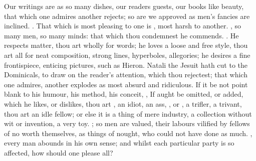Our writings are as so many dishes, our readers guests, our books like beauty,
that which one admires another rejects; so are we approved as men's fancies are
inclined. . That which is most
pleasing to one is , most harsh to another. , so many men, so many minds: that which thou condemnest he
commends. . He respects matter, thou art wholly for words; he loves a loose and
free style, thou art all for neat composition, strong lines, hyperboles,
allegories; he desires a fine frontispiece, enticing pictures, such as
Hieron. Natali the Jesuit hath cut to the Dominicals, to
draw on the reader's attention, which thou rejectest; that which one admires,
another explodes as most absurd and ridiculous. If it be not point blank to his
humour, his method, his conceit, , \etc{} If aught be omitted,
or added, which he likes, or dislikes, thou art , an idiot, an ass, , or , a trifler, a
trivant, thou art an idle fellow; or else it is a thing of mere industry, a
collection without wit or invention, a very toy.
; so men are valued, their labours vilified
by fellows of no worth themselves, as things of nought, who could not have done
as much. , every man abounds in his own
sense; and whilst each particular party is so affected, how should one please
all?


